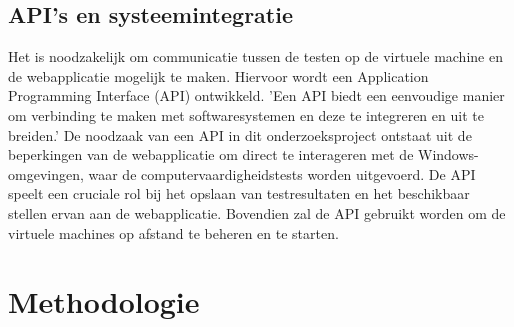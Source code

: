 \subsection{API's en systeemintegratie}
Het is noodzakelijk om communicatie tussen de testen op de virtuele machine en de webapplicatie mogelijk te maken. Hiervoor wordt een Application Programming Interface (API) ontwikkeld. 'Een API biedt een eenvoudige manier om verbinding te maken met softwaresystemen en deze te integreren en uit te breiden.' \autocite{biehl2015api} De noodzaak van een API in dit onderzoeksproject ontstaat uit de beperkingen van de webapplicatie om direct te interageren met de Windows-omgevingen, waar de computervaardigheidstests worden uitgevoerd. De API speelt een cruciale rol bij het opslaan van testresultaten en het beschikbaar stellen ervan aan de webapplicatie. Bovendien zal de API gebruikt worden om de virtuele machines op afstand te beheren en te starten.


\section{Methodologie}%
\label{sec:methodologie}





